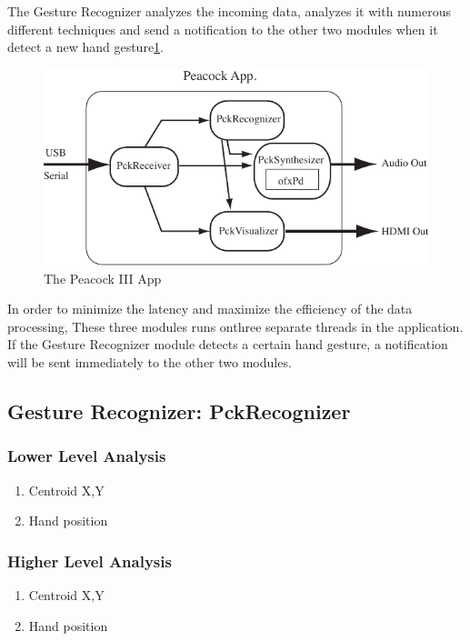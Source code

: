 \documentclass{nime-alternate}
\begin{document}
The Gesture Recognizer analyzes the incoming data, analyzes it with numerous different techniques and send a notification to the other two modules when it detect a new hand gesture\ref{fig:modules}.


\begin{figure}[htbp]
       \centering
              \includegraphics[width=1\columnwidth]{Peacock_app}
       \caption{The Peacock III App}
       \label{fig:modules}
\end{figure}

In order to minimize the latency and maximize the efficiency of the data processing, These three modules runs onthree separate threads in the application. If the Gesture Recognizer module detects a certain hand gesture, a notification will be sent immediately to the other two modules.


\subsection{Gesture Recognizer: PckRecognizer}

\subsubsection{Lower Level Analysis}

\begin{enumerate}
       \item Centroid X,Y
       \item Hand position
\end{enumerate}


\subsubsection{Higher Level Analysis}

\begin{enumerate}
       \item Centroid X,Y
       \item Hand position
\end{enumerate}
\end{document}
